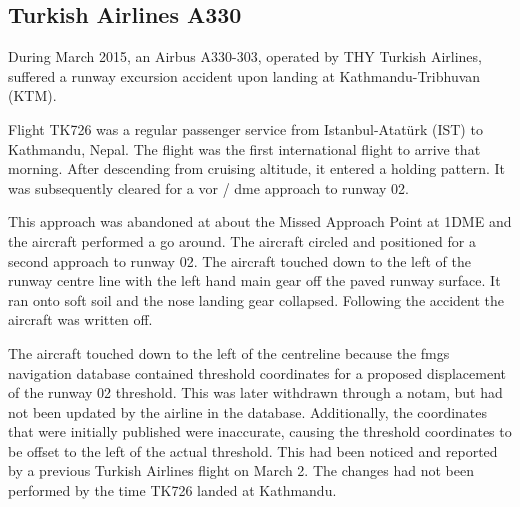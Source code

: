 \subsection{Turkish Airlines A330} \label{bkm:accinc:turkisha330}
During March 2015, an Airbus A330-303, operated by THY Turkish Airlines, suffered a runway excursion accident upon landing at Kathmandu-Tribhuvan (KTM).

Flight TK726 was a regular passenger service from Istanbul-Atat{\"u}rk (IST) to Kathmandu, Nepal. The flight was the first international flight to arrive that morning. After descending from cruising altitude, it entered a holding pattern. It was subsequently cleared for a \gls{vor} / \gls{dme} approach to runway 02. 

This approach was abandoned at about the Missed Approach Point at 1DME and the aircraft performed a go around. The aircraft circled and positioned for a second approach to runway 02. The aircraft touched down to the left of the runway centre line with the left hand main gear off the paved runway surface. It ran onto soft soil and the nose landing gear collapsed. Following the accident the aircraft was written off.

The aircraft touched down to the left of the centreline because the \gls{fmgs} navigation \gls{database} contained threshold coordinates for a proposed displacement of the runway 02 threshold. This was later withdrawn through a \gls{notam}, but had not been updated by the airline in the \gls{database}. Additionally, the coordinates that were initially published were inaccurate, causing the threshold coordinates to be offset to the left of the actual threshold. This had been noticed and reported by a previous Turkish Airlines flight on March 2. The changes had not been performed by the time TK726 landed at Kathmandu. 


